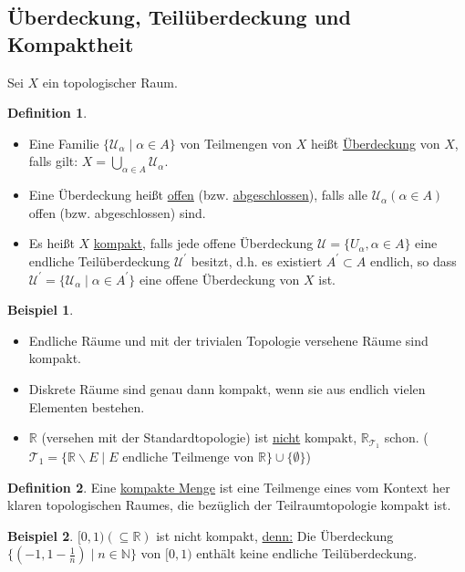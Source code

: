 \documentclass[a4paper,11pt,notitlepage]{report}
\theoremstyle{definition}
\newtheorem{definition}{Definition}[chapter]
\newtheorem{example}{Beispiel}[chapter]
\newcommand{\R}{{\ensuremath{\mathbb{R}}}}
\newcommand{\N}{{\ensuremath{\mathbb{N}}}}
\begin{document}
\subsection{Überdeckung, Teilüberdeckung und Kompaktheit}
Sei $X$ ein topologischer Raum.
\begin{definition}
	\begin{itemize}
		\item Eine Familie $\{\mathcal{U}_\alpha \mid \alpha \in A \}$ von Teilmengen von $X$ heißt \underline{Überdeckung} von $X$, falls gilt: $X = \bigcup\limits_{\alpha \in A}{\mathcal{U}_\alpha}$.
		\item Eine Überdeckung heißt \underline{offen} (bzw. \underline{abgeschlossen}), falls alle $\mathcal{U}_\alpha (\alpha \in A)$ offen (bzw. abgeschlossen) sind.
		\item Es heißt $X$ \underline{kompakt}, falls jede offene Überdeckung $\mathcal{U}=\{U_\alpha, \alpha \in A\}$ eine endliche Teilüberdeckung $\mathcal{U}^\prime$ besitzt, d.h. es existiert $A^\prime \subset A$ endlich, so dass $\mathcal{U}^\prime = \{\mathcal{U}_\alpha \mid \alpha \in A^\prime \}$ eine offene Überdeckung von $X$ ist.
	\end{itemize}
\end{definition}

\begin{example}
	\begin{itemize}
		\item Endliche Räume und mit der trivialen Topologie versehene Räume sind kompakt.
		\item Diskrete Räume sind genau dann kompakt, wenn sie aus endlich vielen Elementen bestehen.
		\item $\R$ (versehen mit der Standardtopologie) ist \underline{nicht} kompakt, $\R_{\mathcal{T}_1}$ schon. ($\mathcal{T}_1 = \{ \R \backslash E \mid E \text{ endliche Teilmenge von } \R \} \cup \{\emptyset\}$)
	\end{itemize}
\end{example}

\begin{definition}	Eine \underline{kompakte Menge} ist eine Teilmenge eines vom Kontext her klaren topologischen Raumes, die bezüglich der Teilraumtopologie kompakt ist.
\end{definition}

\begin{example}
	$[0,1) (\subseteq \R)$ ist nicht kompakt, \underline{denn:} Die Überdeckung $\{(-1,1-\frac{1}{n}) \mid n \in \N \}$ von $[0,1)$ enthält keine endliche Teilüberdeckung.
\end{example}
\end{document}
